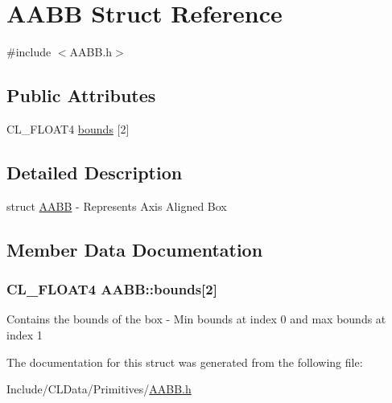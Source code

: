 \hypertarget{struct_a_a_b_b}{}\section{A\+A\+BB Struct Reference}
\label{struct_a_a_b_b}


{\ttfamily \#include $<$A\+A\+B\+B.\+h$>$}

\subsection*{Public Attributes}
\begin{DoxyCompactItemize}
\item 
C\+L\+\_\+\+F\+L\+O\+A\+T4 \hyperlink{struct_a_a_b_b_a5a97a98f5dd70651f4418a952d35d67c}{bounds} \mbox{[}2\mbox{]}
\end{DoxyCompactItemize}


\subsection{Detailed Description}
struct \hyperlink{struct_a_a_b_b}{A\+A\+BB} -\/ Represents Axis Aligned Box 

\subsection{Member Data Documentation}
\subsubsection[{\texorpdfstring{bounds}{bounds}}]{\setlength{\rightskip}{0pt plus 5cm}C\+L\+\_\+\+F\+L\+O\+A\+T4 A\+A\+B\+B\+::bounds\mbox{[}2\mbox{]}}\hypertarget{struct_a_a_b_b_a5a97a98f5dd70651f4418a952d35d67c}{}\label{struct_a_a_b_b_a5a97a98f5dd70651f4418a952d35d67c}
Contains the bounds of the box -\/ Min bounds at index 0 and max bounds at index 1 

The documentation for this struct was generated from the following file\+:\begin{DoxyCompactItemize}
\item 
Include/\+C\+L\+Data/\+Primitives/\hyperlink{_a_a_b_b_8h}{A\+A\+B\+B.\+h}\end{DoxyCompactItemize}
